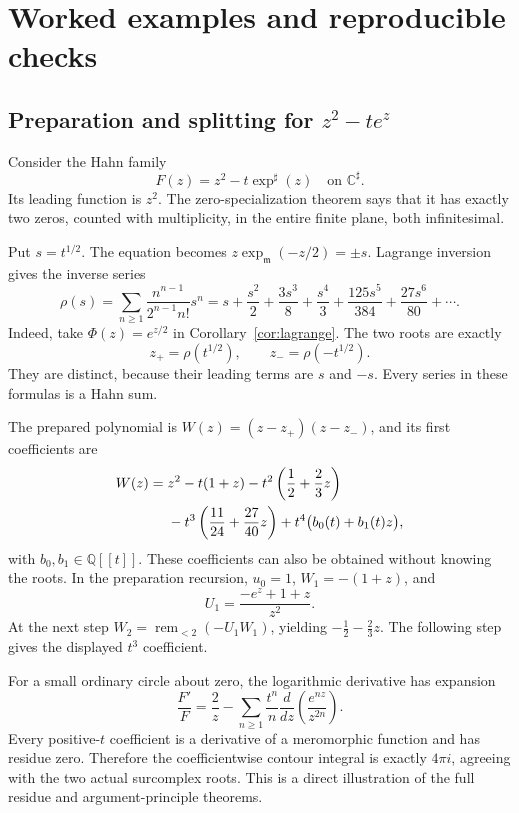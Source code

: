 \documentclass[11pt,a4paper]{article}
\theoremstyle{definition}
\theoremstyle{remark}
\newcommand{\C}{\mathbb C}
\newcommand{\Q}{\mathbb Q}
\newcommand{\mm}{\mathfrak m}
\begin{document}
\section{Worked examples and reproducible checks}\label{sec:examples}
\subsection{Preparation and splitting for \texorpdfstring{$z^2-te^z$}{z squared minus t exp z}}
Consider the Hahn family
\begin{equation}\label{eq:example1}
 F(z)=z^2-t\exp^\sharp(z)
 \quad\text{on }\C^\sharp.
\end{equation}
Its leading function is $z^2$. The zero-specialization theorem says
that it has exactly two zeros, counted with multiplicity, in the
entire finite plane, both infinitesimal.

Put $s=t^{1/2}$. The equation becomes
$z\exp_{\mm}(-z/2)=\pm s$. Lagrange inversion gives the inverse
series
\begin{equation}\label{eq:rho}
 \rho(s)=\sum_{n\ge1}
   \frac{n^{n-1}}{2^{n-1}n!}s^n
 =s+\frac{s^2}{2}+\frac{3s^3}{8}+\frac{s^4}{3}
   +\frac{125s^5}{384}+\frac{27s^6}{80}+\cdots.
\end{equation}
Indeed, take $\Phi(z)=e^{z/2}$ in
Corollary~\ref{cor:lagrange}. The two roots are exactly
\[
 z_+=\rho(t^{1/2}),\qquad z_-=\rho(-t^{1/2}).
\]
They are distinct, because their leading terms are $s$ and $-s$.
Every series in these formulas is a Hahn sum.

The prepared polynomial is
$W(z)=(z-z_+)(z-z_-)$, and its first coefficients are
\begin{align}\label{eq:Wexample}
 W(z)={}&z^2-t(1+z)
        -t^2\left(\frac12+\frac23z\right)\notag\\
       &-t^3\left(\frac{11}{24}+\frac{27}{40}z\right)
        +t^4\bigl(b_0(t)+b_1(t)z\bigr),
\end{align}
with $b_0,b_1\in\Q[[t]]$. These coefficients can also be obtained
without knowing the roots. In the preparation recursion, $u_0=1$,
$W_1=-(1+z)$, and
\[
 U_1=\frac{-e^z+1+z}{z^2}.
\]
At the next step $W_2=\operatorname{rem}_{<2}(-U_1W_1)$, yielding
$-\frac12-\frac23z$. The following step gives the displayed
$t^3$ coefficient.

For a small ordinary circle about zero, the logarithmic derivative
has expansion
\begin{equation}\label{eq:logderexample}
 \frac{F'}F=\frac2z-
  \sum_{n\ge1}\frac{t^n}{n}\frac d{dz}
           \left(\frac{e^{nz}}{z^{2n}}\right).
\end{equation}
Every positive-$t$ coefficient is a derivative of a meromorphic
function and has residue zero. Therefore the coefficientwise contour
integral is exactly $4\pi i$, agreeing with the two actual
surcomplex roots. This is a direct illustration of the full residue
and argument-principle theorems.
\end{document}
